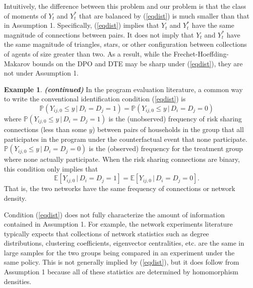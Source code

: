 \documentclass[12pt]{article}
\theoremstyle{definition}
\newtheorem{myexp}{Example}
\newenvironment{myexpcont}
{\addtocounter{myexp}{-1}\begin{myexp}{\textit{\textbf{{(continued)}}}}}
  {\end{myexp}}
\begin{document}
Intuitively, the difference between this problem and our problem is that the class of moments of $Y_{t}$ and $Y_{t}^{*}$ that are balanced by  (\ref{eqdist}) is much smaller than that in Assumption 1. Specifically,  (\ref{eqdist}) implies that $Y_{t}$ and $Y_{t}^{*}$ have the same magnitude of connections between pairs. It does not imply that $Y_{t}$ and $Y_{t}^{*}$ have the same magnitude of triangles, stars, or other configuration between collections of agents of size greater than two. As a result, while the Frechet-Hoeffding-Makarov bounds on the DPO and DTE may be sharp under (\ref{eqdist}), they are not under Assumption 1.     



\begin{myexpcont}
In the program evaluation literature, a common way to write the conventional identification condition (\ref{eqdist}) is
\begin{equation*}
\mathbb{P}\left( Y_{ij, 0} \leq y \, \lvert \, D_i = D_j = 1\right) = \mathbb{P}\left( Y_{ij, 0} \leq y \, \lvert \, D_i = D_j = 0\right)
\end{equation*}
where $\mathbb{P}\left( Y_{ij, 0} \leq y \, \lvert \, D_i = D_j = 1\right)$ is the (unobserved) frequency of risk sharing connections (less than some $y$) between pairs of households in the group that all participates in the program under the counterfactual event that none participate. $\mathbb{P}\left( Y_{ij, 0} \leq y \, \lvert \, D_i = D_j = 0\right)$ is the (observed) frequency for the treatment group where none actually participate. When the risk sharing connections are binary, this condition only implies that 
\begin{equation*}
\mathbb{E}\left[ Y_{ij, 0} \, \lvert \, D_i = D_j = 1\right] = \mathbb{E}\left[ Y_{ij, 0} \, \lvert \, D_i = D_j = 0\right].
\end{equation*}
That is, the two networks have the same frequency of connections or network density. 

Condition (\ref{eqdist}) does not fully characterize the amount of information contained in Assumption 1. For example, the network experiments literature typically expects that collections of network statistics such as degree distributions, clustering coefficients, eigenvector centralities, etc. are the same in large samples for the two groups being compared in an experiment under the same policy. This is not generally implied by  (\ref{eqdist}), but it does follow from Assumption 1 because all of these statistics are determined by homomorphism densities.  
\end{myexpcont}
\end{document}
